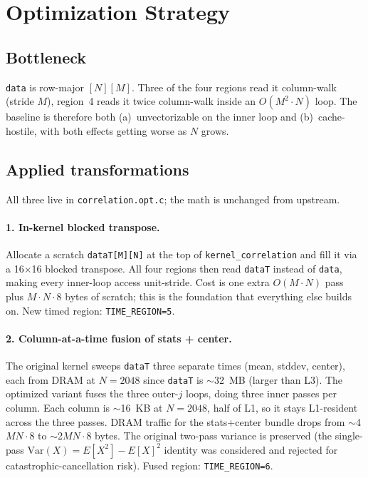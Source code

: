 \documentclass[11pt]{article}
\begin{document}
\section{Optimization Strategy}

\subsection{Bottleneck}

\texttt{data} is row-major $[N][M]$. Three of the four regions read it column-walk (stride $M$), region~4 reads it twice column-walk inside an $O(M^2 \cdot N)$ loop. The baseline is therefore both (a)~unvectorizable on the inner loop and (b)~cache-hostile, with both effects getting worse as $N$ grows.

\subsection{Applied transformations}

All three live in \texttt{correlation.opt.c}; the math is unchanged from upstream.

\paragraph{1. In-kernel blocked transpose.} Allocate a scratch \texttt{dataT[M][N]} at the top of \texttt{kernel\_correlation} and fill it via a 16$\times$16 blocked transpose. All four regions then read \texttt{dataT} instead of \texttt{data}, making every inner-loop access unit-stride. Cost is one extra $O(M \cdot N)$ pass plus $M{\cdot}N{\cdot}8$ bytes of scratch; this is the foundation that everything else builds on. New timed region: \texttt{TIME\_REGION=5}.

\paragraph{2. Column-at-a-time fusion of stats + center.} The original kernel sweeps \texttt{dataT} three separate times (mean, stddev, center), each from DRAM at $N{=}2048$ since \texttt{dataT} is $\sim$32~MB (larger than L3). The optimized variant fuses the three outer-$j$ loops, doing three inner passes per column. Each column is $\sim$16~KB at $N{=}2048$, half of L1, so it stays L1-resident across the three passes. DRAM traffic for the stats+center bundle drops from $\sim$4$M N \cdot 8$ to $\sim$2$M N \cdot 8$ bytes. The original two-pass variance is preserved (the single-pass $\text{Var}(X) = E[X^2] - E[X]^2$ identity was considered and rejected for catastrophic-cancellation risk). Fused region: \texttt{TIME\_REGION=6}.
\end{document}
